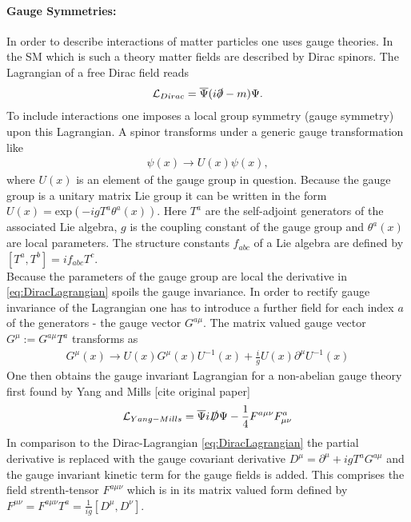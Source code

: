 \paragraph{Gauge Symmetries:} In order to describe interactions of matter particles one uses gauge theories. In the SM which is such a theory matter fields are described by Dirac spinors. The Lagrangian of a free Dirac field reads
\begin{align}
\mathcal{L}_{Dirac} = \overline{\Psi} ( i\slashed{\partial} - m)\Psi.\label{eq:DiracLagrangian}
\end{align}
To include interactions one imposes a local group symmetry (gauge symmetry) upon this Lagrangian. A spinor transforms under a generic gauge transformation like 
\begin{align}
\psi(x) \to U(x)\psi(x),
\end{align}
where $U(x)$ is an element of the gauge group in question. Because the gauge group is a unitary matrix Lie group it can be written in the form $U(x)=\mathrm{exp}(-igT^a\theta^a(x))$. Here $T^a$ are the self-adjoint generators of the associated Lie algebra, $g$ is the coupling constant of the gauge group and $\theta^a(x)$ are local parameters. The structure constants $f_{abc}$ of a Lie algebra are defined by $[T^a,T^b] = if_{abc}T^c$.\\
Because the parameters of the gauge group are local the derivative in \ref{eq:DiracLagrangian} spoils the gauge invariance. In order to rectify gauge invariance of the Lagrangian one has to introduce a further field for each index $a$ of the generators - the gauge vector $G^{a\mu}$. The matrix valued gauge vector $G^\mu := G^{a\mu}T^a$ transforms as 
\begin{align}
G^{\mu}(x) \to U(x)G^\mu(x)U^{-1}(x) + \frac{i}{g}U(x)\partial^\mu U^{-1}(x)
\end{align}
One then obtains the gauge invariant Lagrangian for a non-abelian gauge theory first found by Yang and Mills [cite original paper]
\begin{align}
\mathcal{L}_{Yang-Mills} = \overline{\Psi}i\slashed{D}\Psi - \frac{1}{4}F^{a\mu\nu}F^a_{\mu\nu}
\end{align}
In comparison to the Dirac-Lagrangian \ref{eq:DiracLagrangian} the partial derivative is replaced with the gauge covariant derivative $D^\mu = \partial^\mu + igT^aG^{a\mu}$ and the gauge invariant kinetic term for the gauge fields is added. This comprises the field strenth-tensor $F^{a\mu\nu}$ which is in its matrix valued form defined by $F^{\mu\nu} = F^{a\mu\nu}T^a = \frac{1}{ig}[D^\mu,D^\nu]$.\\

